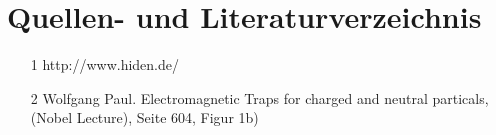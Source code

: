 \section{Quellen- und Literaturverzeichnis}
\begin{itemize}
\item [1] http://www.hiden.de/
\item [2] Wolfgang Paul. Electromagnetic Traps for charged and neutral particals,\\ (Nobel Lecture), Seite 604, Figur 1b)
\end{itemize} 